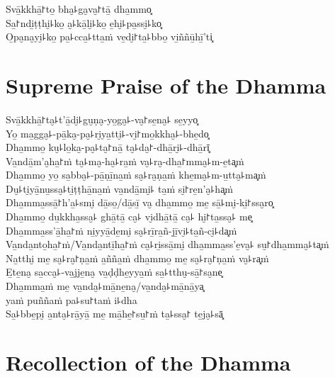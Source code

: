 Svā̱kkhā̱꜓to̱ bha̮꜕ga̮va̮꜓tā̱ dha̱mmo͓\\
Sa̱꜓ndi̱ṭṭhi̮꜕ko̱ a̮꜕kā̱li̮꜕ko̱ e̱hi̮꜕pa̱ssi̮꜕ko͓\\
O̱pa̮na̮yi̮꜕ko̱ pa̱꜕cca̱꜕tta̱ṁ ve̱di̮꜓ta̱꜕bbo̱ vi̱ññū̱hī̱'ti͓

\chapter*{Supreme Praise of the Dhamma}

\begin{leader}
\end{leader}

Svā̱kkhā̱꜓ta̮꜕t'ā̱di̮꜕gu̮ṇa̮-yo̱ga̮꜕-va̮꜓se̱na̮꜕ se̱yyo͓\\
Yo̱ ma̱gga̮꜕-pā̱ka̮-pa̮꜕ri̮ya̱tti̮꜕-vi̮꜓mo̱kkha̮꜕-bhe̱do͓\\
Dha̱mmo̱ ku̮꜕lo̱ka̮-pa̮꜕ta̮꜓nā̱ ta̮꜕da̮꜓-dhā̱ri̮꜕-dhā̱rī͓\\
Va̱ndā̱m'a̮ha̱꜓ṁ ta̮꜕ma̮-ha̮꜕ra̱ṁ va̮꜕ra̮-dha̱꜓mma̮꜕m-e̱ta͓ṁ\\
Dha̱mmo̱ yo̱ sa̱bba̮꜕-pā̱ṇī̱na̱ṁ sa̮꜕ra̮ṇa̱ṁ khe̱ma̮꜕m-u̱tta̮꜕ma͓ṁ\\
Du̮꜕ti̮yā̱nu̱ssa̮꜕ti̱ṭṭhā̱na̱ṁ va̱ndā̱mi̮꜕ ta̱ṁ si̮꜓re̱n'a̮꜕ha͓ṁ\\
Dha̱mma̱ssā̱꜓h'a̱꜕smi̮ dā̱so̱/dā̱sī̱ va̮ dha̱mmo̱ me̱ sā̱꜕mi̮-ki̱꜓ssa̮ro͓\\
Dha̱mmo̱ du̱kkha̱ssa̮꜕ ghā̱tā̱ ca̮꜕ vi̮dhā̱tā̱ ca̮꜕ hi̮꜓ta̱ssa̮꜕ me͓\\
Dha̱mma̱ss'ā̱ha̱꜓ṁ ni̱yyā̱de̱mi̮ sa̮꜕rī̱ra̱ñ-jī̱vi̮꜕ta̱ñ-ci̮꜕da͓ṁ\\
Va̱nda̱nto̱ha̱꜓ṁ/Va̱nda̱ntī̱ha̱꜓ṁ ca̮꜕ri̱ssā̱mi̮ dha̱mma̱ss'e̱va̮꜕ su̮꜓dha̱mma̮꜕ta͓ṁ\\
Na̱tthi̮ me̱ sa̮꜕ra̮꜓ṇa̱ṁ a̱ñña̱ṁ dha̱mmo̱ me̱ sa̮꜕ra̮꜓ṇa̱ṁ va̮꜕ra͓ṁ\\
E̱te̱na̮ sa̱cca̮꜕-va̱jje̱na̮ va̱ḍḍhe̱yya̱ṁ sa̱꜕tthu̮-sā̱꜓sa̮ne͓\\
Dha̱mma̱ṁ me̱ va̱nda̮꜕mā̱ne̱na̮/va̱nda̮꜕mā̱nā̱ya͓\\
\vin yaṁ puññaṁ pa꜕su꜓taṁ i꜕dha\\
Sa̱꜕bbe̱pi̮ a̱nta̮꜕rā̱yā̱ me̱ mā̱he̱꜓su̱꜓ṁ ta̱꜕ssa̮꜓ te̱ja̮꜕sā͓

\clearpage

\chapter{Recollection of the Dhamma}

